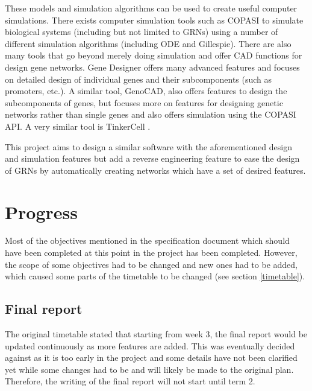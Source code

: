 \documentclass{article}
\begin{document}
	\par These models and simulation algorithms can be used to create useful computer simulations. There exists computer simulation tools such as COPASI \cite{copasi} to simulate biological systems (including but not limited to GRNs) using a number of different simulation algorithms (including ODE and Gillespie). There are also many tools that go beyond merely doing simulation and offer CAD functions for design gene networks. Gene Designer \cite{gene_designer} offers many advanced features and focuses on detailed design of individual genes and their subcomponents (such as promoters, etc.). A similar tool, GenoCAD\cite{genocad}, also offers features to design the subcomponents of genes, but focuses more on features for designing genetic networks rather than single genes and also offers simulation using the COPASI API. A very similar tool is TinkerCell \cite{tinkercell}. 
	\par This project aims to design a similar software with the aforementioned design and simulation features but add a reverse engineering feature to ease the design of GRNs by automatically creating networks which have a set of desired features.
	
	\section{Progress}
	
	Most of the objectives mentioned in the specification document which should have been completed at this point in the project has been completed. However, the scope of some objectives had to be changed and new ones had to be added, which caused some parts of the timetable to be changed (see section \ref{timetable}).
	
	\subsection{Final report} 
	The original timetable stated that starting from week 3, the final report would be updated continuously as more features are added. This was eventually decided against as it is too early in the project and some details have not been clarified yet while some changes had to be and will likely be made to the original plan. Therefore, the writing of the final report will not start until term 2.
	
\end{document}
